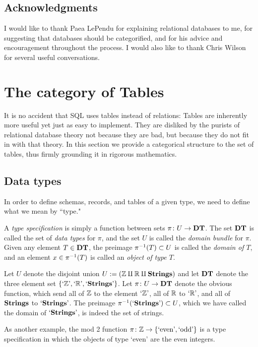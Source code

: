 \documentclass{amsart}
\begin{document}
\subsection{Acknowledgments}

I would like to thank Paea LePendu for explaining relational databases to me, for suggesting that databases should be categorified, and for his advice and encouragement throughout the process.  I would also like to thank Chris Wilson for several useful conversations.

\section{The category of Tables}\label{sec:tables}

It is no accident that SQL uses tables instead of relations: Tables are inherently more useful yet just as easy to implement.  They are disliked by the purists of relational database theory not because they are bad, but because they do not fit in with that theory.  In this section we provide a categorical structure to the set of tables, thus firmly grounding it in rigorous mathematics.  

\subsection{Data types}

In order to define schemas, records, and tables of a given type, we need to define what we mean by ``type." 

\begin{definition}

A {\em type specification} is simply a function between sets $\pi\colon U\rightarrow {\bf DT}$.  The set ${\bf DT}$ is called the set of {\em data types} for $\pi$, and the set $U$ is called the {\em domain bundle} for $\pi$.  Given any element $T\in{\bf DT}$, the preimage $\pi^\m1(T)\ss U$ is called the {\em domain of $T$}, and an element $x\in\pi^\m1(T)$ is called an {\em object of type $T$}.

\end{definition}

\begin{example}\label{ex:type specification}

Let $U$ denote the disjoint union $U:=({\mathbb Z}\amalg{\mathbb R}\amalg{\bf Strings})$ and let ${\bf DT}$ denote the three element set $\{`{\mathbb Z}\textnormal{'}, `{\mathbb R}\textnormal{'}, `{\bf Strings}\textnormal{'}\}$.  Let $\pi\colon U\rightarrow{\bf DT}$ denote the obvious function, which send all of ${\mathbb Z}$ to the element $`{\mathbb Z}\textnormal{'}$, all of ${\mathbb R}$ to $`{\mathbb R}\textnormal{'}$, and all of ${\bf Strings}$ to $`{\bf Strings}\textnormal{'}$. 
The preimage $\pi^\m1(`\Strings\')\ss U$, which we have called the domain of $`{\bf Strings}\textnormal{'}$, is indeed the set of strings.

As another example, the mod 2 function $\pi\colon{\mathbb Z}\rightarrow\{\textnormal{`even'},\textnormal{`odd'}\}$ is a type specification in which the objects of type `even' are the even integers.

\end{example}
\end{document}
